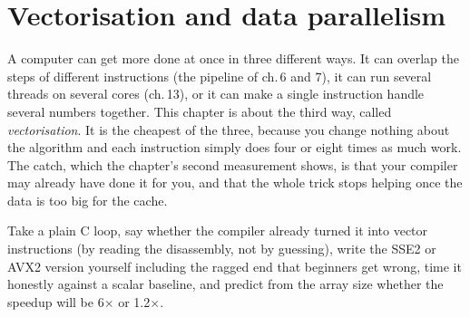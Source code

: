 \chapter{Vectorisation and data parallelism}
\label{ch:systems16}

A computer can get more done at once in three different ways. It can
overlap the steps of different instructions (the pipeline of
ch.\,6 and 7), it can run several threads on several cores (ch.\,13),
or it can make a single instruction handle several numbers together.
This chapter is about the third way, called \emph{vectorisation}. It is
the cheapest of the three, because you change nothing about the
algorithm and each instruction simply does four or eight times as much
work. The catch, which the chapter's second measurement shows, is that
your compiler may already have done it for you, and that the whole trick
stops helping once the data is too big for the cache.

\begin{wins}
Take a plain C loop, say whether the compiler already turned it into
vector instructions (by reading the disassembly, not by guessing),
write the SSE2 or AVX2 version yourself including the ragged end
that beginners get wrong, time it honestly against a scalar baseline,
and predict from the array size whether the speedup will be 6$\times$
or 1.2$\times$.
\end{wins}

